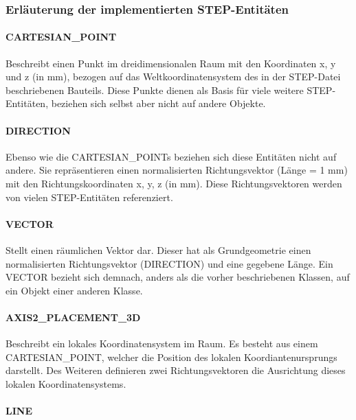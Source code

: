 \subsubsection{Erläuterung der implementierten STEP-Entitäten}

\paragraph{CARTESIAN\_POINT}

Beschreibt einen Punkt im dreidimensionalen Raum mit den Koordinaten x, y und z (in mm), bezogen auf das Weltkoordinatensystem des in der STEP-Datei beschriebenen Bauteils. Diese Punkte dienen als Basis für viele weitere STEP-Entitäten, beziehen sich selbst aber nicht auf andere Objekte. 

\paragraph{DIRECTION}

Ebenso wie die CARTESIAN\_POINTs beziehen sich diese Entitäten nicht auf andere. Sie repräsentieren einen normalisierten Richtungsvektor (Länge = 1 mm) mit den Richtungskoordinaten x, y, z (in mm). Diese Richtungsvektoren werden von vielen STEP-Entitäten referenziert.

\paragraph{VECTOR}

Stellt einen räumlichen Vektor dar. Dieser hat als Grundgeometrie einen normalisierten Richtungsvektor (DIRECTION) und eine gegebene Länge. Ein VECTOR bezieht sich demnach, anders als die vorher beschriebenen Klassen, auf ein Objekt einer anderen Klasse.

\paragraph{AXIS2\_PLACEMENT\_3D}

Beschreibt ein lokales Koordinatensystem im Raum. Es besteht aus einem CARTESIAN\_POINT, welcher die Position des lokalen Koordiantenursprungs darstellt. Des Weiteren definieren zwei Richtungsvektoren die Ausrichtung dieses lokalen Koordinatensystems.

\paragraph{LINE}

